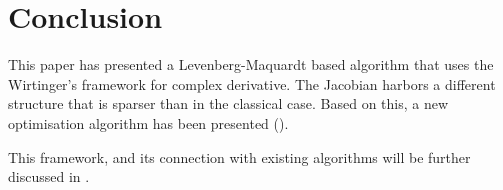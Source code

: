 \section{Conclusion}

This paper has presented a Levenberg-Maquardt based algorithm that
uses the Wirtinger's framework for complex derivative. The Jacobian
harbors a different structure that is sparser than in the classical
case. Based on this, a new optimisation algorithm has been
presented (\COH).

This framework, and its connection with existing algorithms will be
further discussed in \citet[][in prep.]{SmirnovTasse14}.
